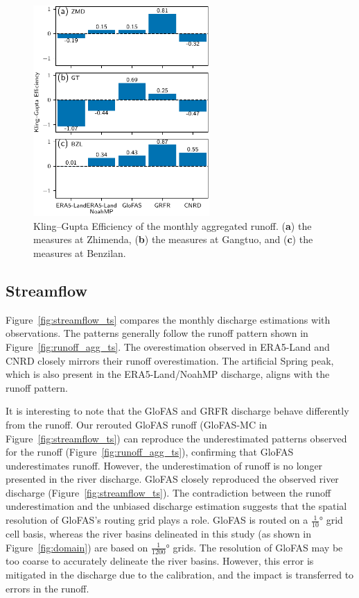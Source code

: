 \documentclass[water,article,submit,pdftex,moreauthors]{Definitions/mdpi}
\begin{document}
\begin{figure}[H]
  \centering
  \includegraphics[width=0.6\textwidth]{runoff_agg_kge_mon.pdf}
  \caption{Kling--Gupta Efficiency of the monthly aggregated runoff. (\textbf{a}) the measures at Zhimenda, (\textbf{b}) the measures at Gangtuo, and (\textbf{c}) the measures at Benzilan.}
  \label{fig:runoff_kge}
\end{figure}

\subsection{Streamflow}

Figure~\ref{fig:streamflow_ts} compares the monthly discharge estimations with observations. The patterns generally follow the runoff pattern shown in Figure~\ref{fig:runoff_agg_ts}. The overestimation observed in ERA5-Land and CNRD closely mirrors their runoff overestimation. The artificial Spring peak, which is also present in the ERA5-Land/NoahMP discharge, aligns with the runoff pattern.

It is interesting to note that the GloFAS and GRFR discharge behave differently from the runoff. Our rerouted GloFAS runoff (GloFAS-MC in Figure~\ref{fig:streamflow_ts}) can reproduce the underestimated patterns observed for the runoff (Figure~\ref{fig:runoff_agg_ts}), confirming that GloFAS underestimates runoff. However, the underestimation of runoff is no longer presented in the river discharge. GloFAS closely reproduced the observed river discharge (Figure~\ref{fig:streamflow_ts}). The contradiction between the runoff underestimation and the unbiased discharge estimation suggests that the spatial resolution of GloFAS's routing grid plays a role. GloFAS is routed on a $\frac{1}{10}$° grid cell basis, whereas the river basins delineated in this study (as shown in Figure~\ref{fig:domain}) are based on $\frac{1}{1200}$° grids. The resolution of GloFAS may be too coarse to accurately delineate the river basins. However, this error is mitigated in the discharge due to the calibration, and the impact is transferred to errors in the runoff.
\end{document}
